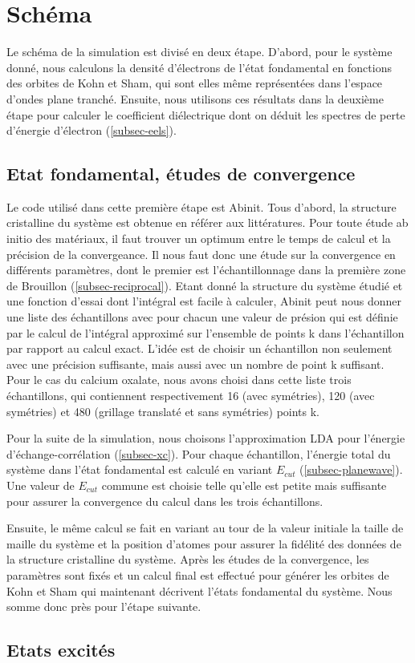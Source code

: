 \section{Schéma}
Le schéma de la simulation est divisé en deux étape.
D'abord, pour le système donné, nous calculons la densité d'électrons de l'état fondamental
en fonctions des orbites de Kohn et Sham,
qui sont elles même représentées dans l'espace d'ondes plane tranché.
Ensuite, nous utilisons ces résultats dans la deuxième étape pour calculer le coefficient
diélectrique dont on déduit les spectres de perte d'énergie d'électron (\cref{subsec-eels}).
\subsection{Etat fondamental, études de convergence}
Le code utilisé dans cette première étape est Abinit.
Tous d'abord, la structure cristalline du système est obtenue en référer aux littératures. %
Pour toute étude ab initio des matériaux,
il faut trouver un optimum entre le temps de calcul et la précision de la convergeance.
Il nous faut donc une étude sur la convergence en différents paramètres,
dont le premier est l'échantillonnage dans la première zone de Brouillon (\cref{subsec-reciprocal}).
Etant donné la structure du système étudié et une fonction d'essai dont l'intégral est facile à calculer,
Abinit peut nous donner une liste des échantillons avec pour chacun une valeur de présion
qui est définie par le calcul de l'intégral approximé sur l'ensemble de points k dans l'échantillon
par rapport au calcul exact.
L'idée est de choisir un échantillon non seulement avec une précision suffisante,
mais aussi avec un nombre de point k suffisant.
Pour le cas du calcium oxalate, nous avons choisi dans cette liste trois échantillons,
qui contiennent respectivement 16 (avec symétries),
120 (avec symétries) et 480 (grillage translaté et sans symétries) points k.

Pour la suite de la simulation,
nous choisons l'approximation LDA pour l'énergie d'échange-corrélation (\cref{subsec-xc}).
Pour chaque échantillon, l'énergie total du système dans l'état fondamental est calculé
en variant $E_{cut}$ (\cref{subsec-planewave}).
Une valeur de $E_{cut}$ commune est choisie telle qu'elle est petite mais suffisante
pour assurer la convergence du calcul dans les trois échantillons.

Ensuite, le même calcul se fait en variant au tour de la valeur initiale
la taille de maille du système et la position d'atomes pour assurer la fidélité
des données de la structure cristalline du système.
Après les études de la convergence, les paramètres sont fixés et un calcul final est effectué
pour générer les orbites de Kohn et Sham qui maintenant décrivent l'états fondamental du système.
Nous somme donc près pour l'étape suivante.

\subsection{Etats excités}

